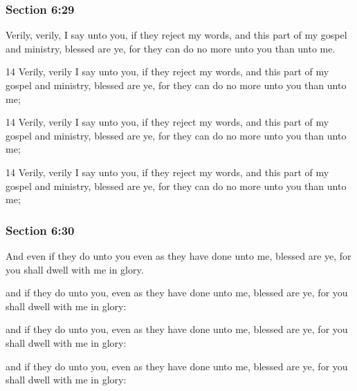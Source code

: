 	\subsubsection{Section 6:29} %
		\label{DC6-29}

		Verily, verily, I say unto you, if they reject my words, and this part of my gospel and ministry, blessed are ye, for they can do no more unto you than unto me.

		\begin{framed}
		\scriptsize
			\begin{compactdesc}
				\item[JSP] 14 Verily, verily I say unto you, if they reject my words, and this part of my gospel and ministry, blessed are ye, for they can do no more unto you than unto me; 
				\item[DC 1835] 14 Verily, verily I say unto you, if they reject my words, and this part of my gospel and ministry, blessed are ye, for they can do no more unto you than unto me; 
				\item[DC 1844] 14 Verily, verily I say unto you, if they reject my words, and this part of my gospel and ministry, blessed are ye, for they can do no more unto you than unto me; 
			\end{compactdesc}
		\end{framed}

	\subsubsection{Section 6:30} %
		\label{DC6-30}

		And even if they do unto you even as they have done unto me, blessed are ye, for you shall dwell with me in glory.

		\begin{framed}
		\scriptsize
			\begin{compactdesc}
				\item[JSP] and if they do unto you, even as they have done unto me, blessed are ye, for you shall dwell with me in glory:
				\item[DC 1835] and if they do unto you, even as they have done unto me, blessed are ye, for you shall dwell with me in glory:
				\item[DC 1844] and if they do unto you, even as they have done unto me, blessed are ye, for you shall dwell with me in glory: 
			\end{compactdesc}
		\end{framed}

